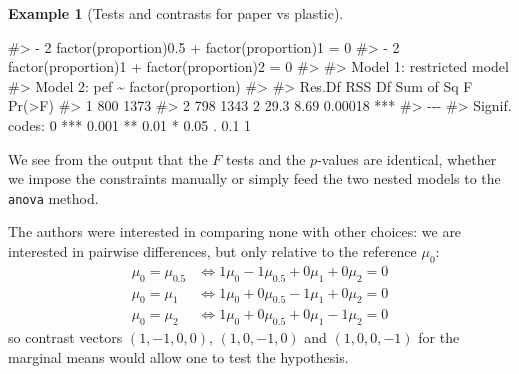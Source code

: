 \documentclass[
  11pt,
  letterpaper,
]{scrbook}
\newenvironment{Shaded}{\begin{snugshade}}{\end{snugshade}}
\newcommand{\CommentTok}[1]{\textcolor[rgb]{0.37,0.37,0.37}{#1}}
\theoremstyle{plain}
\theoremstyle{plain}
\theoremstyle{definition}
\newtheorem{example}{Example}[chapter]
\theoremstyle{definition}
\theoremstyle{remark}
\begin{document}
\begin{example}[Tests and contrasts for paper vs
plastic]
\begin{Shaded}
\begin{Highlighting}[]
\CommentTok{\#\textgreater{} {-} 2 factor(proportion)0.5  + factor(proportion)1 = 0}
\CommentTok{\#\textgreater{} {-} 2 factor(proportion)1  + factor(proportion)2 = 0}
\CommentTok{\#\textgreater{} }
\CommentTok{\#\textgreater{} Model 1: restricted model}
\CommentTok{\#\textgreater{} Model 2: pef \textasciitilde{} factor(proportion)}
\CommentTok{\#\textgreater{} }
\CommentTok{\#\textgreater{}   Res.Df  RSS Df Sum of Sq    F  Pr(\textgreater{}F)    }
\CommentTok{\#\textgreater{} 1    800 1373                              }
\CommentTok{\#\textgreater{} 2    798 1343  2      29.3 8.69 0.00018 ***}
\CommentTok{\#\textgreater{} {-}{-}{-}}
\CommentTok{\#\textgreater{} Signif. codes:  0 \textquotesingle{}***\textquotesingle{} 0.001 \textquotesingle{}**\textquotesingle{} 0.01 \textquotesingle{}*\textquotesingle{} 0.05 \textquotesingle{}.\textquotesingle{} 0.1 \textquotesingle{} \textquotesingle{} 1}
\end{Highlighting}
\end{Shaded}

We see from the output that the \(F\) tests and the \(p\)-values are
identical, whether we impose the constraints manually or simply feed the
two nested models to the \texttt{anova} method.

The authors were interested in comparing none with other choices: we are
interested in pairwise differences, but only relative to the reference
\(\mu_{0}\): \begin{align*}
\mu_0 = \mu_{0.5}  & \iff 1\mu_0 - 1\mu_{0.5} + 0\mu_{1} + 0 \mu_{2} = 0\\
\mu_0 = \mu_{1} & \iff 1\mu_0 + 0\mu_{0.5} -1\mu_{1} + 0 \mu_{2} = 0\\
\mu_0 = \mu_{2} & \iff 1\mu_0 + 0\mu_{0.5} + 0\mu_{1} -1 \mu_{2} = 0
\end{align*} so contrast vectors \((1, -1, 0, 0)\), \((1, 0, -1, 0)\)
and \((1, 0, 0, -1)\) for the marginal means would allow one to test the
hypothesis.


\end{example}
\end{document}
